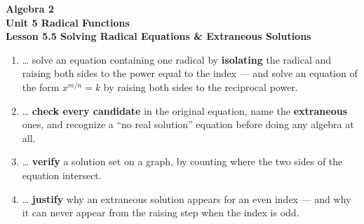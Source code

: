 \documentclass[10pt]{article}
\begin{document}
\vspace{-0.8in}

\begin{center}
  {\color{white}\textbf{\LARGE Algebra 2}}\\[4pt]
  {\color{forestmid}\large\textbf{Unit 5 \quad Radical Functions}}\\[6pt]
  {\color{white}\textbf{\large Lesson 5.5 \quad Solving Radical Equations \& Extraneous Solutions}}
\end{center}

\vspace{0.22in}
\namedateperiod
\vspace{0.18in}

\begin{learningtargetbox}
\small
\begin{enumerate}[leftmargin=1.5em, itemsep=5pt]
  \item \ldots{} solve an equation containing one radical by \textbf{isolating} the radical and raising both sides to the power equal to the index --- and solve an equation of the form $x^{m/n}=k$ by raising both sides to the reciprocal power.
  \item \ldots{} \textbf{check every candidate} in the original equation, name the \textbf{extraneous} ones, and recognize a ``no real solution'' equation before doing any algebra at all.
  \item \ldots{} \textbf{verify} a solution set on a graph, by counting where the two sides of the equation intersect.
  \item \ldots{} \textbf{justify} why an extraneous solution appears for an even index --- and why it can never appear from the raising step when the index is odd.
\end{enumerate}
\end{learningtargetbox}

\vspace{0.14in}
\end{document}
